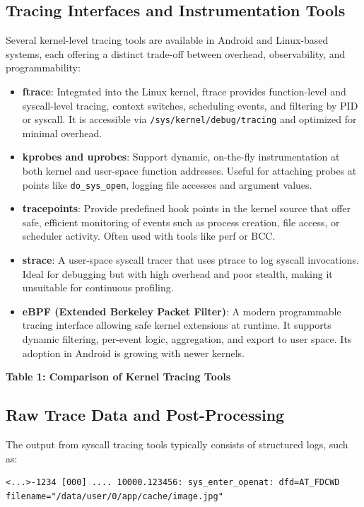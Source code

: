 \documentclass[a4paper,12pt]{report}
\begin{document}
\subsection{Tracing Interfaces and Instrumentation Tools}
Several kernel-level tracing tools are available in Android and Linux-based systems, each offering a distinct trade-off between overhead, observability, and programmability:

\begin{itemize}
\item \textbf{ftrace}: Integrated into the Linux kernel, ftrace provides function-level and syscall-level tracing, context switches, scheduling events, and filtering by PID or syscall. It is accessible via \texttt{/sys/kernel/debug/tracing} and optimized for minimal overhead.
\item \textbf{kprobes and uprobes}: Support dynamic, on-the-fly instrumentation at both kernel and user-space function addresses. Useful for attaching probes at points like \texttt{do\_sys\_open}, logging file accesses and argument values.
\item \textbf{tracepoints}: Provide predefined hook points in the kernel source that offer safe, efficient monitoring of events such as process creation, file access, or scheduler activity. Often used with tools like perf or BCC.
\item \textbf{strace}: A user-space syscall tracer that uses ptrace to log syscall invocations. Ideal for debugging but with high overhead and poor stealth, making it unsuitable for continuous profiling.
\item \textbf{eBPF (Extended Berkeley Packet Filter)}: A modern programmable tracing interface allowing safe kernel extensions at runtime. It supports dynamic filtering, per-event logic, aggregation, and export to user space. Its adoption in Android is growing with newer kernels.
\end{itemize}

\textbf{Table 1: Comparison of Kernel Tracing Tools}


\subsection{Raw Trace Data and Post-Processing}
The output from syscall tracing tools typically consists of structured logs, such as:

\begin{verbatim}
<...>-1234 [000] .... 10000.123456: sys_enter_openat: dfd=AT_FDCWD filename="/data/user/0/app/cache/image.jpg"
\end{verbatim}
\end{document}
